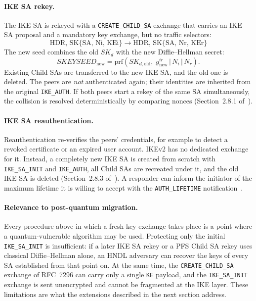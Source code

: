 \paragraph{IKE SA rekey.}
The IKE SA is rekeyed with a \texttt{CREATE\_CHILD\_SA} exchange that carries
an IKE SA proposal and a mandatory key exchange, but no traffic selectors:
\[
    \text{HDR, SK\{SA, Ni, KEi\}} \;\longrightarrow\; \text{HDR, SK\{SA, Nr, KEr\}}
\]
The new seed combines the old $SK_d$ with the new Diffie--Hellman secret:
\begin{equation}
    \mathit{SKEYSEED}_{\mathrm{new}} = \mathrm{prf}(SK_{d,\mathrm{old}},\; g^{ir}_{\mathrm{new}} \,|\, N_i \,|\, N_r).
\end{equation}
Existing Child SAs are transferred to the new IKE SA, and the old one is
deleted. The peers are \emph{not} authenticated again; their identities are
inherited from the original \texttt{IKE\_AUTH}. If both peers start a rekey
of the same SA simultaneously, the collision is resolved deterministically by
comparing nonces (Section~2.8.1 of~\cite{rfc7296}).

\paragraph{IKE SA reauthentication.}
Reauthentication re-verifies the peers' credentials, for example to detect a
revoked certificate or an expired user account. IKEv2 has no dedicated
exchange for it. Instead, a completely new IKE SA is created from scratch with
\texttt{IKE\_SA\_INIT} and \texttt{IKE\_AUTH}, all Child SAs are recreated
under it, and the old IKE SA is deleted (Section~2.8.3 of~\cite{rfc7296}).
A responder can inform the initiator of the maximum lifetime it is willing to
accept with the \texttt{AUTH\_LIFETIME} notification~\cite{rfc4478}.

\paragraph{Relevance to post-quantum migration.}
Every procedure above in which a fresh key exchange takes place is a point
where a quantum-vulnerable algorithm may be used. Protecting only the initial
\texttt{IKE\_SA\_INIT} is insufficient: if a later IKE SA rekey or a PFS Child
SA rekey uses classical Diffie--Hellman alone, an HNDL adversary can recover
the keys of every SA established from that point on. At the same time, the
\texttt{CREATE\_CHILD\_SA} exchange of RFC~7296 can carry only a single
\texttt{KE} payload, and the \texttt{IKE\_SA\_INIT} exchange is sent
unencrypted and cannot be fragmented at the IKE layer. These limitations are
what the extensions described in the next section address.

